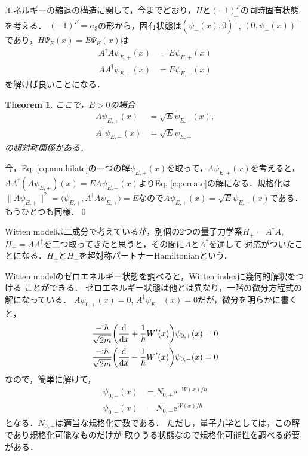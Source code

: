 \documentclass[english, dvipdfmx, a4paper]{jsarticle}
\theoremstyle{break}
\newtheorem{thm}{Theorem}[section]
\renewcommand{\i}{\mathrm{i}}
\newcommand{\e}{\mathrm{e}}
\begin{document}
	エネルギーの縮退の構造に関して，今までどおり，$H$と$(-1)^{F}$の同時固有状態を考える．
	$(-1)^{F} = \sigma_3$の形から，固有状態は$(\psi_+(x), 0)^{\top}$, $(0, \psi_-(x))^{\top}$であり，$H\Psi_E(x) = E\Psi_E(x)$は
	\begin{align}
		A^{\dag}A\psi_{E, +}(x) &= E \psi_{E, +}(x)\\
		AA^{\dag}\psi_{E, -}(x) &= E\psi_{E, -}(x)
	\end{align}
	を解けば良いことになる．

	\begin{thm}
		ここで，$E > 0$の場合
		\begin{align}
			A\psi_{E, +}(x) &= \sqrt{E} \psi_{E, -}(x),\label{eq:annihilate}\\
			A^{\dag}\psi_{E, -}(x) &= \sqrt{E}\psi_{E, +}\label{eq:create}
		\end{align}
			の超対称関係がある．
	\end{thm}
	今，Eq. \eqref{eq:annihilate}の一つの解$\psi_{E, +}(x)$を取って，$A\psi_{E, +}(x)$を考えると，
	$AA^{\dag}(A\psi_{E, +})(x)  = EA\psi_{E, +}(x)$よりEq. \eqref{eq:create}の解になる．規格化は$\|A\psi_{E, +}\|^2 = \langle \psi_{E, +}, A^{\dag}A\psi_{E, +}\rangle = E$なので$A\psi_{E, +}(x) = \sqrt{E}\psi_{E, -}(x)$である．もうひとつも同様．\qed

	Witten modelは二成分で考えているが，別個の2つの量子力学系$H_+=A^{\dag}A$, $H_-=AA^{\dag}$を二つ取ってきたと思うと，その間に$A$と$A^{\dag}$を通して
	対応がついたことになる．$H_+$と$H_-$を超対称パートナーHamiltonianという．


	Witten modelのゼロエネルギー状態を調べると，Witten indexに幾何的解釈をつける
	ことができる．
	ゼロエネルギー状態は他とは異なり，一階の微分方程式の解になっている．
	$A\psi_{0, +}(x) = 0 $, $A^{\dag}\psi_{E, -}(x) = 0$だが，微分を明らかに書くと，
	\begin{align}
		\frac{-\i\hbar}{\sqrt{2m}}\qty(\dv{}{x}+\frac{1}{\hbar}W'(x))\psi_{0, +}(x) &= 0\\
		\frac{-\i\hbar}{\sqrt{2m}}\qty(\dv{}{x}-\frac{1}{\hbar}W'(x))\psi_{0, -}(x) &= 0
	\end{align}
	なので，簡単に解けて，
	\begin{align}
		\psi_{0, +}(x) &= N_{0, +}\e^{-W(x)/\hbar}\\
		\psi_{0, -}(x) &= N_{0, -}\e^{W(x)/\hbar}
	\end{align}
	となる．$N_{0, \pm}$は適当な規格化定数である．
	ただし，量子力学としては，この解であり規格化可能なものだけが
	取りうる状態なので規格化可能性を調べる必要がある．
\end{document}
